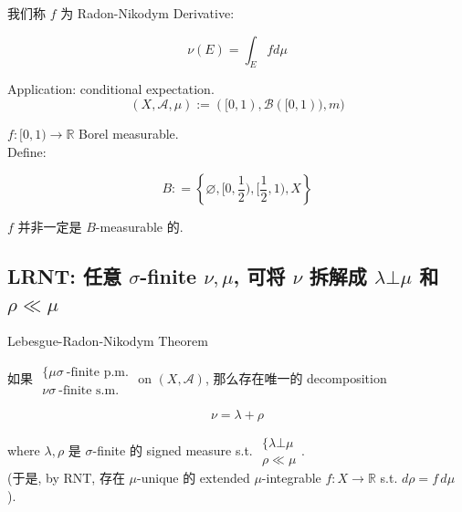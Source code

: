 \documentclass{qlnotes-export}
\begin{document}
我们称 \(f\) 为 Radon-Nikodym Derivative:

\[\nu(E) = \int_{E}f d\mu\]

\begin{example}\label{ex-11-radon-nikodym-theorem-example-004}

Application: conditional expectation.\\

\[(X,\mathcal{A},\mu) := (\lbrack 0,1),\mathcal{B}(\lbrack 0,1)),m)\]

\(f:\lbrack 0,1)\rightarrow{\mathbb{R}}\) Borel measurable.\\
Define:

\[B: = \left\{ {\varnothing,\lbrack 0,\frac{1}{2}),\lbrack\frac{1}{2},1),X} \right\}\]

\(f\) 并非一定是 \(B\)-measurable 的.

\end{example}

\subsection{\texorpdfstring{LRNT: 任意 \(\sigma\)-finite \(\nu,\mu\), 可将 \(\nu\) 拆解成 \(\lambda\bot\mu\) 和 \(\rho \ll \mu\)}{LRNT: 任意 \textbackslash sigma-finite \textbackslash nu,\textbackslash mu, 可将 \textbackslash nu 拆解成 \textbackslash lambda\textbackslash bot\textbackslash mu 和 \textbackslash rho \textbackslash ll \textbackslash mu}}\label{lrnt-ux4efbux610f-sigma-finite-numu-ux53efux5c06-nu-ux62c6ux89e3ux6210-lambdabotmu-ux548c-rho-ll-mu}

\begin{theorem}{Lebesgue-Radon-Nikodym Theorem}\label{thm-11-radon-nikodym-theorem-lebesgue-radon-nikodym-theorem}

如果 \(\begin{matrix}
{\{\mu\sigma\ \text{-finite p.m.}} \\
{\nu\sigma\ \text{-finite s.m.}}
\end{matrix}\) on \((X,\mathcal{A})\), 那么存在唯一的 decomposition

\[\nu = \lambda + \rho\]

where \(\lambda,\rho\) 是 \(\sigma\)-finite 的 signed measure s.t. \(\begin{matrix}
{\{\lambda\bot\mu} \\
{\rho \ll \mu}
\end{matrix}\).\\
(于是, by RNT, 存在 \(\mu\)-unique 的 extended \(\mu\)-integrable \(f:X\rightarrow{\mathbb{R}}\) s.t. \(d\rho = f\, d\mu\) ).

\end{theorem}
\end{document}
